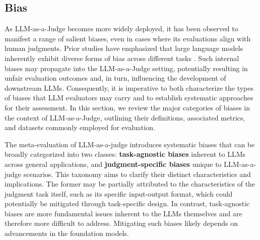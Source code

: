 



\subsection{Bias}
\label{Evaluation:Bias}
As LLM-as-a-Judge becomes more widely deployed, it has been observed to manifest a range of salient biases, even in cases where its evaluations align with human judgments. Prior studies have emphasized that large language models inherently exhibit diverse forms of bias across different tasks \citep{biassurvey, dai2024unifying, tan-etal-2024-blinded}. 
Such internal biases may propagate into the LLM-as-a-Judge setting, potentially resulting in unfair evaluation outcomes and, in turn, influencing the development of downstream LLMs. 
Consequently, it is imperative to both characterize the types of biases that LLM evaluators may carry and to establish systematic approaches for their assessment. 
In this section, we review the major categories of biases in the context of LLM-as-a-Judge, outlining their definitions, associated metrics, and datasets commonly employed for evaluation.

The meta-evaluation of  LLM-as-a-judge introduces systematic biases that can be broadly categorized into two classes: \textbf{task-agnostic biases} inherent to LLMs across general applications, and \textbf{judgment-specific biases} unique to LLM-as-a-judge scenarios. 
This taxonomy aims to clarify their distinct characteristics and implications.
The former may be partially attributed to the characteristics of the judgment task itself, such as its specific input-output format, which could potentially be mitigated through task-specific design. 
In contrast, task-agnostic biases are more fundamental issues inherent to the LLMs themselves and are therefore more difficult to address. Mitigating such biases likely depends on advancements in the foundation models.

